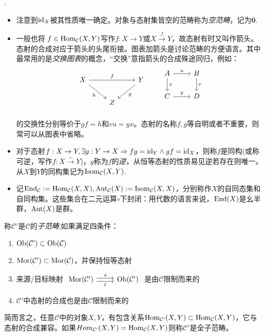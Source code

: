 \begin{Rmk}.
    \begin{itemize}
        \item 注意到$\mathrm{id}_X$被其性质唯一确定。对象与态射集皆空的范畴称为\emph{空范畴}，记为$\mathbf{0}$.
        \item 一般也将 $f \in \operatorname{Hom}_{\mathcal{C}}(X,Y)$写作$f:X\rightarrow Y$或$X\xrightarrow{f}Y$，故态射有时又叫作箭头。态射的合成对应于箭头的头尾衔接。图表加箭头是讨论范畴的方便语言。其中最常用的是\emph{交换图表}的概念，“交换”意指箭头的合成殊途同归，例如：
        \[\begin{tikzcd}
            X \arrow[rr, "f"] \arrow[rd, "h"'] & & Y \arrow[ld, "g"] \\
            & Z &
        \end{tikzcd}
        \qquad
        \begin{tikzcd}
            A \arrow[r, "u"] \arrow[d,"x"] & B \arrow[d,"v"] \\
            C \arrow[r,"y"]  & D    \\
        \end{tikzcd}
        \]
        的交换性分别等价于$gf=h$和$vu=yx$。态射的名称$f,g$等自明或者不重要，则常可以从图表中省略。
        \item 对于态射$f:X\rightarrow Y,\exists g:Y\rightarrow X\Rightarrow fg=\mathrm{id}_Y \wedge gf= \mathrm{id}_X$，则称$f$是同构(或称可逆，写作$f:X\xrightarrow{\sim}Y$)，$g$称为$f$的\emph{逆}，从恒等态射的性质易见逆若存在则唯一。从$X$到$Y$的同构集记为$\operatorname{Isom}_{\mathcal{C}}(X,Y)$.
        \item 记$\operatorname{End}_{\mathcal{C}}:=\operatorname{Hom}_{\mathcal{C}}(X,X), \operatorname{Aut}_{\mathcal{C}}(X):=\operatorname{Isom}_{\mathcal{C}}(X,X)$，分别称作$X$的自同态集和自同构集。这些集合在二元运算$\circ$下封闭：用代数的语言来说，$\operatorname{End}(X)$是幺半群，$\operatorname{Aut}(X)$是群。
    \end{itemize}
\end{Rmk}

\begin{Def}[子范畴] 称$\mathcal{C}'$是$\mathcal{C}$的\emph{子范畴},如果满足四条件：
    \begin{enumerate}
        \item $\operatorname{Ob}(\mathcal{C}') \subset \operatorname{Ob}(\mathcal{C})$
        \item $\operatorname{Mor}(\mathcal{C}') \subset \operatorname{Mor}(\mathcal{C})$，并保持恒等态射
        \item 来源/目标映射 
        $\begin{tikzcd}
            \Mor(\mathcal{C}')
                \arrow[yshift=-0.5ex,r,"t"']
                \arrow[yshift= 0.5ex,r,"s" ] &
            \Obj(\mathcal{C}')
        \end{tikzcd}$
        是由$\mathcal{C}$限制而来的
        \item $\mathcal{C}'$中态射的合成也是由$\mathcal{C}$限制而来的
    \end{enumerate}
    简而言之，任意$\mathcal{C}$中的对象$X,Y$，有包含关系$\operatorname{Hom}_{\mathcal{C}'}(X,Y)\subset \operatorname{Hom}_{\mathcal{C}}(X,Y)$，它与态射的合成兼容。如果$Hom_{\mathcal{C}'}(X,Y)=\operatorname{Hom}_{\mathcal{C}}(X,Y)$则称$\mathcal{C}'$是全子范畴。
    
\end{Def}

